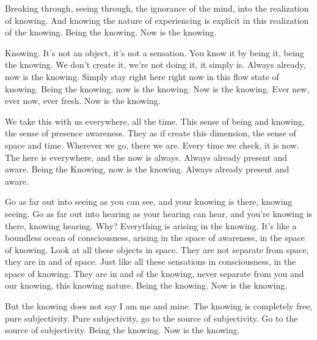 \documentclass[12pt,openany]{book}
\begin{document}
Breaking through, seeing through, the ignorance of the mind, \linebreak into the realization of knowing. And knowing the nature of experiencing is explicit in this realization of the knowing. Being the knowing. Now is the knowing.

Knowing. It's not an object, it’s not a sensation. You know it by being it, being the knowing. We don't create it, we’re not doing it, it simply is. Always already, now is the knowing. Simply stay right here right now in this flow state of knowing. Being the knowing, now is the knowing. Now is the knowing. Ever new, ever now, ever fresh. Now is the knowing.

We take this with us everywhere, all the time. This sense of being and knowing, the sense of presence awareness. They as if create this dimension, the sense of space and time. Wherever we go, there we are. Every time we check, it is now. The here is everywhere, and the now is always. Always already present and aware. Being the Knowing, now is the knowing. Always already present and aware.

Go as far out into seeing as you can see, and your knowing is there, knowing seeing. Go as far out into hearing as your hearing can hear, and you're knowing is there, knowing hearing. Why? Everything is arising in the knowing. It’s like a boundless ocean of consciousness, arising in the space of awareness, in the space of knowing. Look at all these objects in space. They are not separate from space, they are in and of space. Just like all these sensations in consciousness, in the space of knowing. They are in and of the knowing, never separate from you and our knowing, this knowing nature. Being the knowing. Now is the knowing.

But the knowing does not say I am me and mine. The knowing is completely free, pure subjectivity. Pure subjectivity, go to the source of subjectivity. Go to the source of subjectivity. Being the knowing. Now is the knowing.
\end{document}
